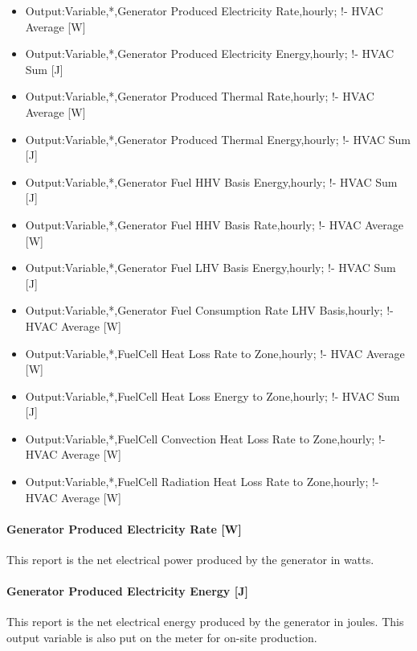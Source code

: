 \begin{itemize}
\item
  Output:Variable,*,Generator Produced Electricity Rate,hourly; !- HVAC Average {[}W{]}
\item
  Output:Variable,*,Generator Produced Electricity Energy,hourly; !- HVAC Sum {[}J{]}
\item
  Output:Variable,*,Generator Produced Thermal Rate,hourly; !- HVAC Average {[}W{]}
\item
  Output:Variable,*,Generator Produced Thermal Energy,hourly; !- HVAC Sum {[}J{]}
\item
  Output:Variable,*,Generator Fuel HHV Basis Energy,hourly; !- HVAC Sum {[}J{]}
\item
  Output:Variable,*,Generator Fuel HHV Basis Rate,hourly; !- HVAC Average {[}W{]}
\item
  Output:Variable,*,Generator Fuel LHV Basis Energy,hourly; !- HVAC Sum {[}J{]}
\item
  Output:Variable,*,Generator Fuel Consumption Rate LHV Basis,hourly; !- HVAC Average {[}W{]}
\item
  Output:Variable,*,FuelCell Heat Loss Rate to Zone,hourly; !- HVAC Average {[}W{]}
\item
  Output:Variable,*,FuelCell Heat Loss Energy to Zone,hourly; !- HVAC Sum {[}J{]}
\item
  Output:Variable,*,FuelCell Convection Heat Loss Rate to Zone,hourly; !- HVAC Average {[}W{]}
\item
  Output:Variable,*,FuelCell Radiation Heat Loss Rate to Zone,hourly; !- HVAC Average {[}W{]}
\end{itemize}

\paragraph{Generator Produced Electricity Rate {[}W{]}}\label{generator-produced-electric-power-w-3}

This report is the net electrical power produced by the generator in watts.

\paragraph{Generator Produced Electricity Energy {[}J{]}}\label{generator-produced-electric-energy-j-3}

This report is the net electrical energy produced by the generator in joules. This output variable is also put on the meter for on-site production.

